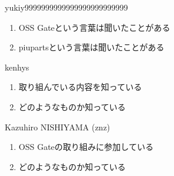 \begin{prework}{ yukiy9999999999999999999999999 }
  \begin{enumerate}
  \item OSS Gateという言葉は聞いたことがある
  \item piupartsという言葉は聞いたことがある
  \end{enumerate}
\end{prework}

\begin{prework}{ kenhys }
  \begin{enumerate}
  \item 取り組んでいる内容を知っている
  \item どのようなものか知っている
  \end{enumerate}
\end{prework}

\begin{prework}{ Kazuhiro NISHIYAMA (znz) }
  \begin{enumerate}
  \item OSS Gateの取り組みに参加している
  \item どのようなものか知っている
  \end{enumerate}
\end{prework}

